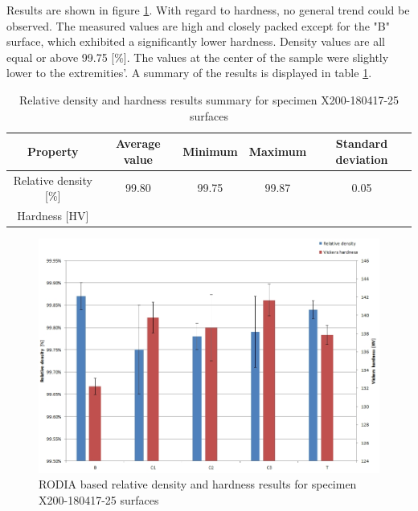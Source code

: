 Results are shown in figure \ref{fig:HD-180417}. With regard to hardness, no general trend could be observed. The measured values are high and closely packed except for the "B" surface, which exhibited a significantly lower hardness. Density values are all equal or above 99.75 [\%]. The values at the center of the sample were slightly lower to the extremities'. A summary of the results is displayed in table \ref{tab:25}.

 \begin{center}
	\begin{table}[ht]
		\begin{tabular}{|c|c |c |c| c|}
			\hline
			Property& Average value & Minimum & Maximum & Standard deviation \\
			\hline 
			\hline   
			Relative density [\%] & 99.80 & 99.75 & 99.87 & 0.05\\
			Hardness [HV] &&&&\\
			\hline
		\end{tabular}
		
		\caption[Relative density and hardness results summary for specimen X200-180417-25 surfaces]{Relative density and hardness results summary for specimen X200-180417-25 surfaces}
		\label{tab:25}
	\end{table}
\end{center}


\begin{figure}[ht]
\centering
\centerline{\includegraphics[scale=0.62]{Images/HD-180417}}
\decoRule
\caption[RODIA based relative density and hardness results for specimen X200-180417-25 surfaces]{RODIA based relative density and hardness results for specimen X200-180417-25 surfaces}
\label{fig:HD-180417}
\end{figure} 

